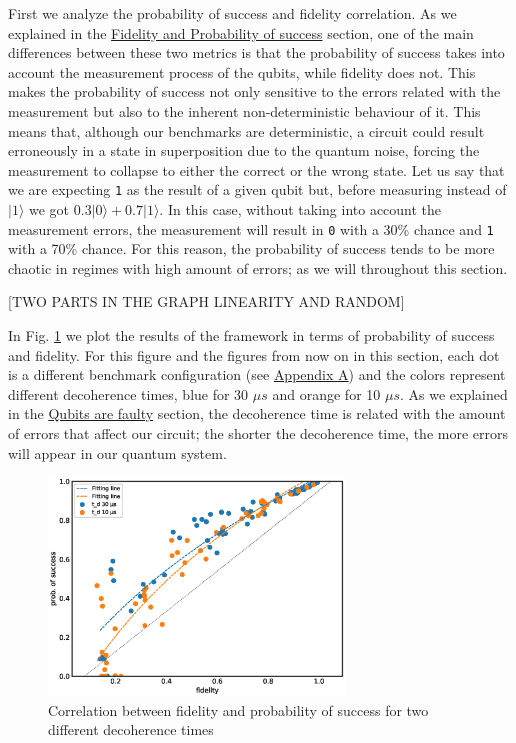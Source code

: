 First we analyze the probability of success and fidelity correlation.
As we explained in the \hyperref[sec:org0c7b2c2]{Fidelity and Probability of success} section, one of the main differences between these two metrics is that the probability of success takes into account the measurement process of the qubits, while fidelity does not.
This makes the probability of success not only sensitive to the errors related with the measurement but also to the inherent non-deterministic behaviour of it.
This means that, although our benchmarks are deterministic, a circuit could result erroneously in a state in superposition due to the quantum noise, forcing the measurement to collapse to either the correct or the wrong state.
Let us say that we are expecting \texttt{1} as the result of a given qubit but, before measuring instead of \(|1\rangle\) we got \(0.3 |0\rangle + 0.7 |1\rangle\).
In this case, without taking into account the measurement errors, the measurement will result in \texttt{0} with a 30\% chance and \texttt{1} with a 70\% chance.
For this reason, the probability of success tends to be more chaotic in regimes with high amount of errors; as we will throughout this section.


[TWO PARTS IN THE GRAPH LINEARITY AND RANDOM]

In Fig. \ref{fig:f_ps_correlation_with_meas_error} we plot the results of the framework in terms of probability of success and fidelity. 
For this figure and the figures from now on in this section, each dot is a different benchmark configuration (see \href{appendix-1.org}{Appendix A}) and the colors represent different decoherence times, blue for 30 \(\mu s\) and orange for 10 \(\mu s\).
As we explained in the \href{quantum_computing.org}{Qubits are faulty} section, the decoherence time is related with the amount of errors that affect our circuit; the shorter the decoherence time, the more errors will appear in our quantum system.


\begin{figure}[htbp]
\centering
\includegraphics[width=0.7\textwidth]{figures/f_ps_correlation.eps}
\caption{\label{fig:f_ps_correlation_with_meas_error}
Correlation between fidelity and probability of success for two different decoherence times}
\end{figure}



